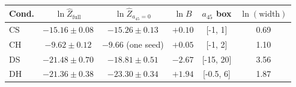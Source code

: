 \begin{tabular}{lccccc}\toprule
Cond. & $\ln\hat Z_{\mathrm{full}}$ & $\ln\hat Z_{a_{45}=0}$ & $\ln B$ & $a_{45}$ box & $\ln(\text{width})$\\
\midrule
CS & $-15.16 \pm 0.08$ & $-15.26 \pm 0.13$ & $+0.10$ & [-1, 1] & 0.69\\
CH & $-9.62 \pm 0.12$ & $-9.66$ (one seed) & $+0.05$ & [-1, 2] & 1.10\\
DS & $-21.48 \pm 0.70$ & $-18.81 \pm 0.51$ & $-2.67$ & [-15, 20] & 3.56\\
DH & $-21.36 \pm 0.38$ & $-23.30 \pm 0.34$ & $+1.94$ & [-0.5, 6] & 1.87\\
\bottomrule\end{tabular}
